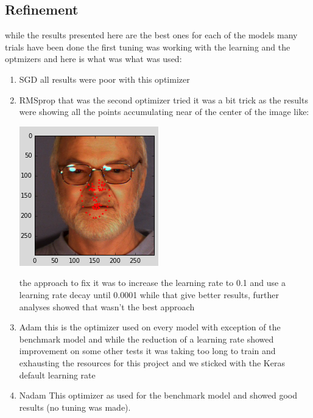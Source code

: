 \documentclass[11pt]{article}
\begin{document}
\subsection{Refinement}
\label{sec:orgb8026d3}
while the results presented here are the best ones for each of the models 
many trials have been done the first tuning was working with the learning
and the optmizers and here is what was what was used:
\begin{enumerate}
\item SGD
\label{sec:org02772c1}
all results were poor with this optimizer

\item RMSprop
\label{sec:orgf1e329a}
that was the second optimizer tried it was a bit trick as the results were
showing all the points accumulating near of the center of the image like:

\begin{center}
\includegraphics[width=.9\linewidth]{./images/RMSprop.png}
\end{center}

the approach to fix it was to increase the learning rate to 0.1 and use a
learning rate decay until 0.0001 while that give better results, further
analyses showed that wasn't the best approach

\item Adam
\label{sec:org618d911}
this is the optimizer used on every model with exception of the benchmark
model and while the reduction of a learning rate showed improvement on some
other tests it was taking too long to train and exhausting the resources
for this project and we sticked with the Keras default learning rate

\item Nadam
\label{sec:org3d5913c}
This optimizer as used for the benchmark model and showed good results (no
tuning was made).
\end{enumerate}
\end{document}
